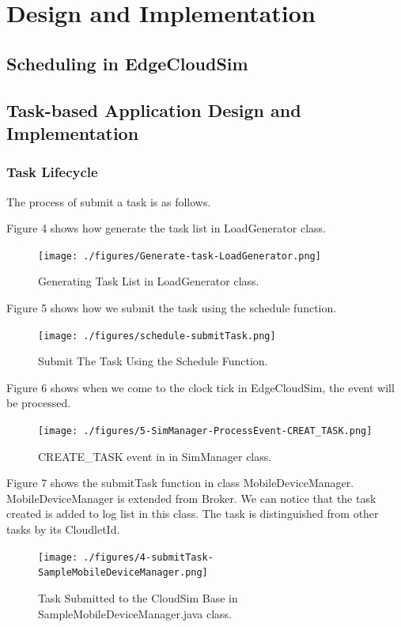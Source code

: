 \section{Design and Implementation}

\subsection{Scheduling in EdgeCloudSim}


\subsection{Task-based Application Design and Implementation}

\subsubsection{Task Lifecycle}




The process of submit a task is as follows.


Figure 4 shows how generate the task list in LoadGenerator class.
\begin{figure}
	\centering
	\texttt{[image: ./figures/Generate-task-LoadGenerator.png]}
	\caption{\label{fig:frog}Generating Task List in LoadGenerator class.}
\end{figure}

Figure 5 shows how we submit the task using the schedule function.
\begin{figure}
	\centering
	\texttt{[image: ./figures/schedule-submitTask.png]}
	\caption{\label{fig:frog}Submit The Task Using the Schedule Function.}
\end{figure}


Figure 6 shows when we come to the clock tick in EdgeCloudSim, the event will be processed.
\begin{figure}
	\centering
	\texttt{[image: ./figures/5-SimManager-ProcessEvent-CREAT\_TASK.png]}
	\caption{\label{fig:frog}CREATE\_TASK event in in SimManager class.}
\end{figure}

Figure 7 shows the submitTask function in class MobileDeviceManager. MobileDeviceManager is extended from Broker. We can notice that the task created is added to log list in this class. The task is distinguished from other tasks by its CloudletId. 
\begin{figure}
	\centering
	\texttt{[image: ./figures/4-submitTask-SampleMobileDeviceManager.png]}
	\caption{\label{fig:frog}Task Submitted to the CloudSim Base in SampleMobileDeviceManager.java class.}
\end{figure}

